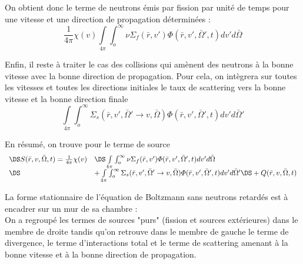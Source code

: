 On obtient donc le terme de neutrons émis par fission par unité de temps pour une vitesse et une
direction de propagation déterminées :
\begin{equation}
\frac{1}{{4\pi }}\chi (v) \int\limits_{4\pi }    \int_o^\infty     \nu {\Sigma _f}(\bar r,v')\varPhi (\bar r,v',\bar \Omega ',t)dv'd\bar \Omega 
\end{equation}


Enfin, il reste à traiter le cas des collisions qui amènent des neutrons à la bonne vitesse avec la
bonne direction de propagation. Pour cela, on intègrera sur toutes les vitesses et toutes les directions initiales
le taux de scattering vers la bonne vitesse et la bonne direction finale
\begin{equation}
\int\limits_{4\pi }    \int_o^\infty     {\Sigma _s}(\bar r,v',\bar \Omega ' \to v,\bar \Omega )\varPhi (\bar r,v',\bar \Omega ',t)dv'd\bar \Omega '
\end{equation}

En résumé, on trouve pour le terme de source
\begin{equation}
\begin{array}{ll}
\DS S(\bar r,v,\bar \Omega ,t) = \frac{1}{{4\pi }}\chi (v)&\DS\int\limits_{4\pi }    \int_o^\infty     \nu {\Sigma _f}(\bar r,v')\varPhi (\bar r,v',\bar \Omega ',t)dv'd\bar \Omega\\ \DS& +
\int\limits_{4\pi }    \int_o^\infty     {\Sigma _s}(\bar r,v',\bar \Omega ' \to v,\bar \Omega )\varPhi (\bar r,v',\bar \Omega ',t)dv'd\bar \Omega ' \DS+ Q(\bar r,v,\bar \Omega ,t)
\end{array}
\end{equation}

La forme stationnaire de l'équation de Boltzmann sans neutrons retardés 
est à encadrer sur un mur de sa chambre :\\

On a regroupé les termes de sources "purs" (fission et sources extérieures) dans le membre de droite
tandis qu'on retrouve dans le membre de gauche le terme de divergence, le terme d'interactions total
et le terme de scattering amenant à la bonne vitesse et à la bonne direction de propagation.\ \\

